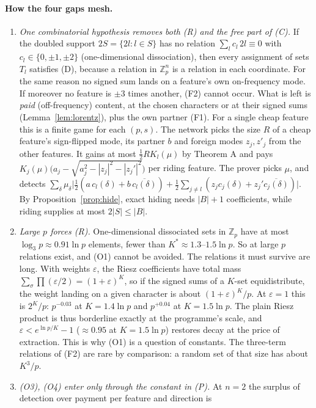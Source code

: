 \documentclass[11pt]{article}
\theoremstyle{definition}
\begin{document}
\paragraph{How the four gaps mesh.}
\begin{enumerate}
\item \emph{One combinatorial hypothesis removes both (R) and the free part of (C).}  If the doubled support $2S=\{2l:l\in S\}$ has no
relation $\sum_lc_l\,2l\equiv0$ with $c_l\in\{0,\pm1,\pm2\}$ (one-dimensional dissociation), then every assignment of sets $T_l$ satisfies (D),
because a relation in $\mathbb Z_p^n$ is a relation in each coordinate.  For the same reason no signed sum lands on a feature's own
on-frequency mode.  If moreover no feature is $\pm3$ times another, (F2) cannot occur.  What is left is \emph{paid} (off-frequency) content, at the chosen characters or at their
signed sums (Lemma~\ref{lem:lorentz}), plus the own partner (F1).  For a single cheap feature this is a finite game for each $(p,s)$.  The network picks the size $R$ of
a cheap feature's sign-flipped mode, its partner $b$ and foreign modes $z_j,z'_j$ from the other features.  It gains at most
$\frac12RK_l(\mu)$ by Theorem A and pays $K_j(\mu)\big(a_j-\sqrt{a_j^2-|z_j|^2-|z_j'|^2}\big)$ per riding feature.  The prover picks $\mu$, and
detects $\sum_\delta\mu_\delta\big|\tfrac12(a\,c_l(\delta)+b\,\overline{c_l(\delta)})+\tfrac12\sum_{j\ne l}(z_jc_j(\delta)+z_j'\overline{c_j(\delta)})\big|$.  By
Proposition~\ref{prop:hide}, exact hiding needs $|B|+1$ coefficients, while riding supplies at most $2|S|\le|B|$.
\item \emph{Large $p$ forces (R).}  One-dimensional dissociated sets in $\mathbb Z_p$ have at most $\log_3p\approx0.91\ln p$ elements, fewer
than $K^*\approx1.3$--$1.5\ln p$.  So at large $p$ relations exist, and (O1) cannot be avoided.  The relations it must survive are long.
With weights $\varepsilon$, the Riesz coefficients have total mass $\sum_\sigma\prod(\varepsilon/2)=(1+\varepsilon)^K$, so if the signed sums of a
$K$-set equidistribute, the weight landing on a given character is about $(1+\varepsilon)^K/p$.  At $\varepsilon=1$ this is
$2^K/p$: $p^{-0.03}$ at $K=1.4\ln p$ and $p^{+0.04}$ at $K=1.5\ln p$.  The plain Riesz product is thus borderline exactly at the programme's
scale, and $\varepsilon<e^{\ln p/K}-1$ ($\approx0.95$ at $K=1.5\ln p$) restores decay at the price of extraction.  This is why (O1) is a
question of constants.  The three-term relations of (F2) are rare by comparison: a random set of that size has about $K^3/p$.
\item \emph{(O3), (O4) enter only through the constant in (P).}  At $n=2$ the surplus of detection over payment per feature and direction is

\end{enumerate}
\end{document}
